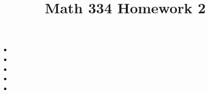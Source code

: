 \documentclass{article}
\title{Math 334 Homework 2}
\begin{document}
\maketitle
\begin{itemize}[label=]
	\item 
	\item 
	\item 
	\item 
	\item 
\end{itemize}
\end{document}
